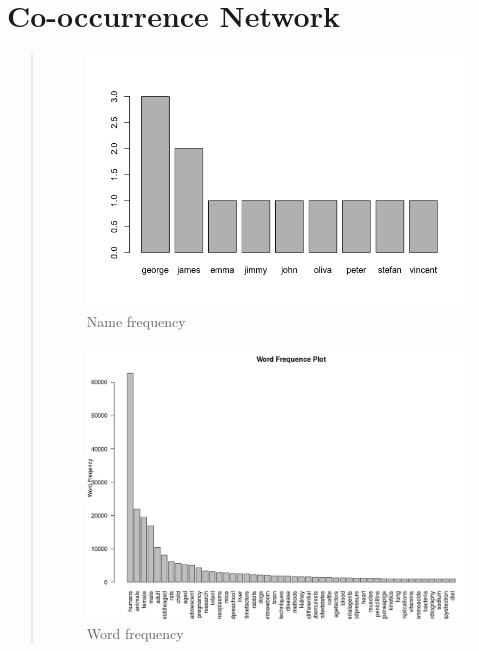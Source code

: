 \documentclass[letterpaper,11pt,english]{sphinxmanual}
\begin{document}
\section{Co-occurrence Network}
\label{socialnetwork:co-occurrence-network}\begin{quote}
\begin{figure}[htbp]
\centering
\capstart

\includegraphics{name_freq.png}
\caption{Name frequency}\label{socialnetwork:fig-namefreq}\end{figure}
\begin{figure}[htbp]
\centering
\capstart

\includegraphics{word_freq.png}
\caption{Word frequency}\label{socialnetwork:fig-wordfreq}\end{figure}
\begin{figure}[htbp]
\centering
\capstart


\end{figure}
\end{quote}
\end{document}
